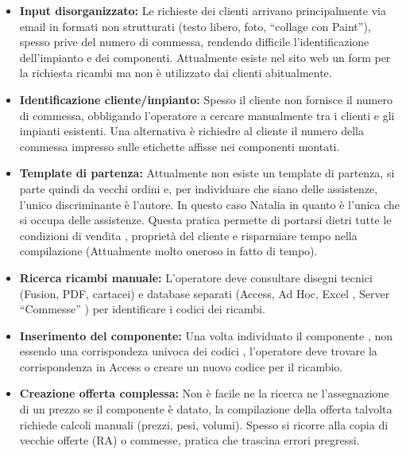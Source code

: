 \documentclass[12pt, a4paper]{article} %
\begin{document}
\begin{itemize}
      \item \textbf{Input disorganizzato:} Le richieste dei clienti arrivano principalmente via email in formati non strutturati (testo libero, foto, ``collage con Paint''),
            spesso prive del numero di commessa, rendendo difficile l'identificazione dell'impianto e dei componenti.
            Attualmente esiste nel sito web un form per la richiesta ricambi ma non è utilizzato dai clienti abitualmente.
      \item \textbf{Identificazione cliente/impianto:} Spesso il cliente non fornisce il numero di commessa, obbligando l'operatore a cercare manualmente tra i clienti e gli impianti esistenti.
            Una alternativa è richiedre al cliente il numero della commessa impresso sulle etichette affisse nei componenti montati.
      \item \textbf{Template di partenza:} Attualmente non esiste un template di partenza, si parte quindi da vecchi ordini e, per individuare che siano delle assistenze, l'unico discriminante è l'autore.
            In questo caso Natalia in quanto è l'unica che si occupa delle assistenze. Questa pratica permette di portarsi dietri tutte le condizioni di vendita ,
            proprietà del cliente e risparmiare tempo nella compilazione (Attualmente molto oneroso in fatto di tempo).
      \item \textbf{Ricerca ricambi manuale:} L'operatore deve consultare disegni tecnici (Fusion, PDF, cartacei) e database separati (Access, Ad Hoc, Excel , Server ``Commesse'' ) per identificare i codici dei ricambi.
      \item \textbf{Inserimento del componente:} Una volta individuato il componente , non essendo una corrispondeza univoca dei codici ,
            l'operatore deve trovare la corrispondenza in Access o creare un nuovo codice per il ricambio.
      \item \textbf{Creazione offerta complessa:} Non è facile ne la ricerca ne l'assegnazione di un prezzo se il componente è datato, la compilazione della offerta talvolta richiede calcoli manuali
            (prezzi, pesi, volumi). Spesso si ricorre alla copia di vecchie offerte (RA) o commesse, pratica che trascina errori pregressi.
\end{itemize}
\end{document}

